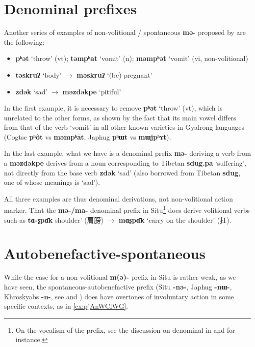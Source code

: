 \documentclass[oneside,a4paper,11pt]{article}
\newcommand{\ipa}[1]{\textbf{{\phon\mbox{#1}}}} %
\newcommand{\zh}[1]{{\cn #1}}
\begin{document}
\section{Denominal prefixes}
Another series of examples of non-volitional / spontaneous \ipa{mə-} proposed by \citet[506]{prins16kyomkyo}  are the following:

\begin{itemize}
\item \ipa{pʰət} `throw' (vt); \ipa{təmpʰat} `vomit' (n); \ipa{məmpʰət} `vomit' (vi, non-volitional)
\item \ipa{təskruʔ} `body' $\rightarrow$ \ipa{məskruʔ} `(be) pregnant'
\item \ipa{zdək} `sad' $\rightarrow$ \ipa{məzdəkpe} `pitiful'
\end{itemize}

In the first example, it is necessary to remove \ipa{pʰət} `throw' (vt), which is unrelated to the other forms, as shown by the fact that its main vowel differs from that of the verb `vomit' in all other known varieties in Gyalrong languages (Cogtse \ipa{pʰôt} vs \ipa{məmpʰāt}, Japhug \ipa{pʰɯt} vs \ipa{mɯjpʰɤt}).

In the last example,  what we have is a denominal prefix \ipa{mə-} deriving a verb from a \ipa{məzdəkpe} derives from a noun corresponding to Tibetan \ipa{sdug.pa} `suffering', not directly from the base verb  \ipa{zdək} `sad' (also borrowed from Tibetan \ipa{sdug}, one of whose meanings is `sad').

All three examples are thus denominal derivations, not non-volitional action marker. That the \ipa{mə-/ma-} denominal prefix in Situ\footnote{On the vocalism of the prefix, see the discussion on denominal in \citealt{jackson98morphology} and \citealt{linxr93jiarong} for instance.} does derive volitional verbs such as \ipa{tɑ-ʂpɑ̄k}  shoulder'  (\zh{肩膀}) $\rightarrow$ \ipa{mɑʂpɑ̄k} `carry on the shoulder' (\zh{扛}).


\section{Autobenefactive-spontaneous}
While the case for a non-volitional \ipa{m(ə)-} prefix in Situ is rather weak, as we have seen, the spontaneous-autobenefactive prefix (Situ \ipa{-nə-}, Japhug \ipa{-nɯ-}, Khroskyabs \ipa{-n-}, see  \citet{jacques16japhug} and  \citet[158-160]{lai13affixale}) does have overtones of involuntary action in some specific contexts, as in \ref{ex:pjAnWClWG}. 
\end{document}
